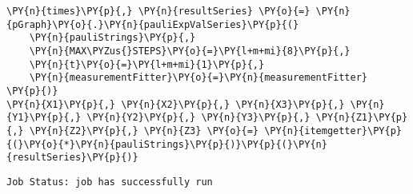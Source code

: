     \begin{tcolorbox}[breakable, size=fbox, boxrule=1pt, pad at break*=1mm,colback=cellbackground, colframe=cellborder]
\begin{Verbatim}[commandchars=\\\{\}]
\PY{n}{times}\PY{p}{,} \PY{n}{resultSeries} \PY{o}{=} \PY{n}{pGraph}\PY{o}{.}\PY{n}{pauliExpValSeries}\PY{p}{(}
    \PY{n}{pauliStrings}\PY{p}{,}
    \PY{n}{MAX\PYZus{}STEPS}\PY{o}{=}\PY{l+m+mi}{8}\PY{p}{,}
    \PY{n}{t}\PY{o}{=}\PY{l+m+mi}{1}\PY{p}{,}
    \PY{n}{measurementFitter}\PY{o}{=}\PY{n}{measurementFitter}
\PY{p}{)}
\PY{n}{X1}\PY{p}{,} \PY{n}{X2}\PY{p}{,} \PY{n}{X3}\PY{p}{,} \PY{n}{Y1}\PY{p}{,} \PY{n}{Y2}\PY{p}{,} \PY{n}{Y3}\PY{p}{,} \PY{n}{Z1}\PY{p}{,} \PY{n}{Z2}\PY{p}{,} \PY{n}{Z3} \PY{o}{=} \PY{n}{itemgetter}\PY{p}{(}\PY{o}{*}\PY{n}{pauliStrings}\PY{p}{)}\PY{p}{(}\PY{n}{resultSeries}\PY{p}{)}
\end{Verbatim}
\end{tcolorbox}

    \begin{Verbatim}[commandchars=\\\{\}]
Job Status: job has successfully run
    \end{Verbatim}

